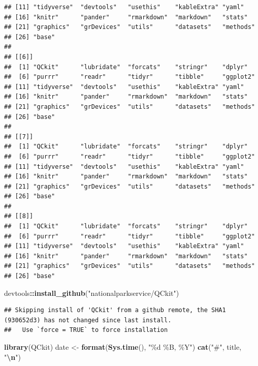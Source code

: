 \documentclass[
]{article}
\newenvironment{Shaded}{\begin{snugshade}}{\end{snugshade}}
\newcommand{\FunctionTok}[1]{\textcolor[rgb]{0.13,0.29,0.53}{\textbf{#1}}}
\newcommand{\NormalTok}[1]{#1}
\newcommand{\OtherTok}[1]{\textcolor[rgb]{0.56,0.35,0.01}{#1}}
\newcommand{\SpecialCharTok}[1]{\textcolor[rgb]{0.81,0.36,0.00}{\textbf{#1}}}
\newcommand{\StringTok}[1]{\textcolor[rgb]{0.31,0.60,0.02}{#1}}
\begin{document}
\begin{verbatim}
## [11] "tidyverse"  "devtools"   "usethis"    "kableExtra" "yaml"      
## [16] "knitr"      "pander"     "rmarkdown"  "markdown"   "stats"     
## [21] "graphics"   "grDevices"  "utils"      "datasets"   "methods"   
## [26] "base"      
## 
## [[6]]
##  [1] "QCkit"      "lubridate"  "forcats"    "stringr"    "dplyr"     
##  [6] "purrr"      "readr"      "tidyr"      "tibble"     "ggplot2"   
## [11] "tidyverse"  "devtools"   "usethis"    "kableExtra" "yaml"      
## [16] "knitr"      "pander"     "rmarkdown"  "markdown"   "stats"     
## [21] "graphics"   "grDevices"  "utils"      "datasets"   "methods"   
## [26] "base"      
## 
## [[7]]
##  [1] "QCkit"      "lubridate"  "forcats"    "stringr"    "dplyr"     
##  [6] "purrr"      "readr"      "tidyr"      "tibble"     "ggplot2"   
## [11] "tidyverse"  "devtools"   "usethis"    "kableExtra" "yaml"      
## [16] "knitr"      "pander"     "rmarkdown"  "markdown"   "stats"     
## [21] "graphics"   "grDevices"  "utils"      "datasets"   "methods"   
## [26] "base"      
## 
## [[8]]
##  [1] "QCkit"      "lubridate"  "forcats"    "stringr"    "dplyr"     
##  [6] "purrr"      "readr"      "tidyr"      "tibble"     "ggplot2"   
## [11] "tidyverse"  "devtools"   "usethis"    "kableExtra" "yaml"      
## [16] "knitr"      "pander"     "rmarkdown"  "markdown"   "stats"     
## [21] "graphics"   "grDevices"  "utils"      "datasets"   "methods"   
## [26] "base"
\end{verbatim}

\begin{Shaded}
\begin{Highlighting}[]
\NormalTok{devtools}\SpecialCharTok{::}\FunctionTok{install\_github}\NormalTok{(}\StringTok{"nationalparkservice/QCkit"}\NormalTok{)}
\end{Highlighting}
\end{Shaded}

\begin{verbatim}
## Skipping install of 'QCkit' from a github remote, the SHA1 (930652d3) has not changed since last install.
##   Use `force = TRUE` to force installation
\end{verbatim}

\begin{Shaded}
\begin{Highlighting}[]
\FunctionTok{library}\NormalTok{(QCkit)}
\NormalTok{date }\OtherTok{\textless{}{-}} \FunctionTok{format}\NormalTok{(}\FunctionTok{Sys.time}\NormalTok{(), }\StringTok{"\%d \%B, \%Y"}\NormalTok{)}
\FunctionTok{cat}\NormalTok{(}\StringTok{"\#"}\NormalTok{, title, }\StringTok{"}\SpecialCharTok{\textbackslash{}n}\StringTok{"}\NormalTok{)}
\end{Highlighting}
\end{Shaded}
\end{document}
